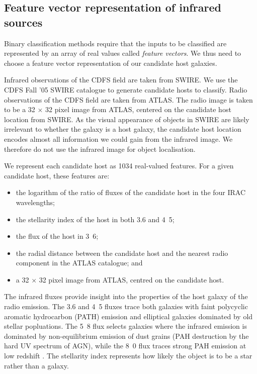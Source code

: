 \documentclass[fleqn,usenatbib,usedcolumn]{mnras}
\begin{document}
  \subsection{Feature vector representation of infrared sources}
  \label{vector-representation-of-infrared-sources}

    Binary classification methods require that the inputs to be classified are
    represented by an array of real values called \emph{feature vectors}. We
    thus need to choose a feature vector representation of our candidate host
    galaxies.

    Infrared observations of the CDFS field are taken from SWIRE. We use the
    CDFS Fall '05 SWIRE catalogue \citep{surace05swire} to generate candidate
    hosts to classify. Radio observations of the CDFS field are taken from
    ATLAS. The radio image is taken to be a 32 $\times$ 32 pixel image from
    ATLAS, centered on the candidate host location from SWIRE.
    As the visual appearance of objects in SWIRE are likely irrelevant to
    whether the galaxy is a host galaxy, the candidate host location encodes
    almost all information we could gain from the infrared image. We therefore
    do not use the infrared image for object localisation.

    We represent each candidate host as 1034 real-valued features. For a given
    candidate host, these features are:
    \begin{itemize}
      \item the logarithm of the ratio of fluxes of the candidate host in the
        four IRAC wavelengths;
      \item the stellarity index of the host in both 3.6 and
        \unit{4.5}{\micro\meter};
      \item the flux of the host in \unit{3.6}{\micro\meter};
      \item the radial distance between the candidate host and the nearest
        radio component in the ATLAS catalogue; and
      \item a 32 $\times$ 32 pixel image from ATLAS, centred on the candidate
        host.
    \end{itemize}

    The infrared fluxes provide insight into the properties of the host galaxy
    of the radio emission. The 3.6 and \unit{4.5}{\micro\meter} fluxes trace
    both galaxies with faint polycyclic aromatic hydrocarbon (PATH) emission and
    elliptical galaxies dominated by old stellar popluations. The
    \unit{5.8}{\micro\meter} flux selects galaxies where the infrared emission
    is dominated by non-equilibrium emission of dust grains (PAH destruction
    by the hard UV spectrum of AGN), while the \unit{8.0}{\micro\meter} flux
    traces strong PAH emission at low redshift \citep{Sajina2005}.
    The stellarity index represents how likely the object is to be a star
    rather than a galaxy.
\end{document}
